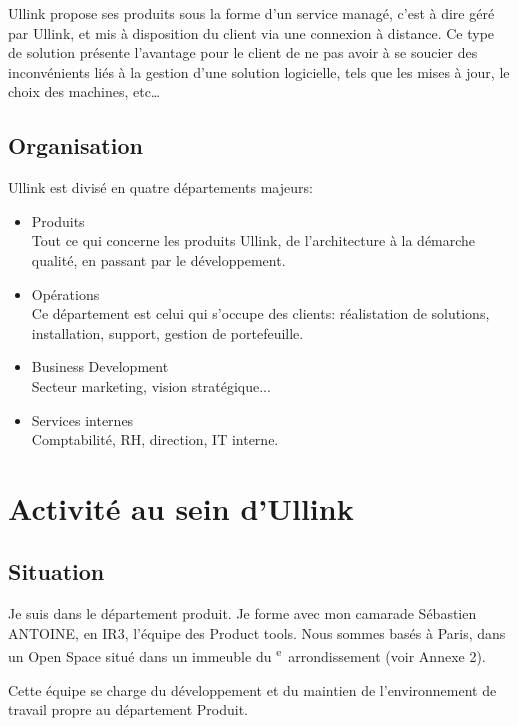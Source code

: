 \documentclass[a4paper, 12pt]{article}
\begin{document}
Ullink propose ses produits sous la forme d'un service managé, c'est à dire géré par Ullink, et mis à disposition du client via une connexion à distance. Ce type de solution présente l'avantage pour le client de ne pas avoir à se soucier des inconvénients liés à la gestion d'une solution logicielle, tels que les mises à jour, le choix des machines, etc\dots

\subsection{Organisation}

Ullink est divisé en quatre départements majeurs:

\begin{itemize}
\item Produits\\
Tout ce qui concerne les produits Ullink, de l'architecture à la démarche qualité, en passant par le développement.

\item Opérations\\
Ce département est celui qui s'occupe des clients: réalistation de solutions, installation, support, gestion de portefeuille.

\item Business Development\\
Secteur marketing, vision stratégique...

\item Services internes\\
Comptabilité, RH, direction, IT interne.
\end{itemize}

\section{Activité au sein d'Ullink}

\subsection{Situation}

Je suis dans le département produit. Je forme avec mon camarade Sébastien ANTOINE, en IR3, l'équipe des Product tools. Nous sommes basés à Paris, dans un Open Space situé dans un immeuble du \textsc{}\textsuperscript{e}~arrondissement (voir Annexe 2).

Cette équipe se charge du développement et du maintien de l'environnement de travail propre au département Produit.
\end{document}
